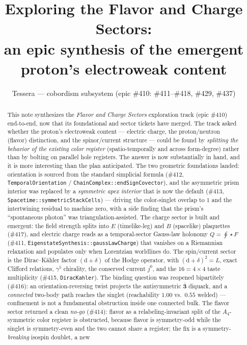\documentclass[11pt]{article}
\title{\bfseries Exploring the Flavor and Charge Sectors:\\
an epic synthesis of the emergent proton's electroweak content}
\author{Tessera --- cobordism subsystem
(epic \#410: \#411--\#418, \#429, \#437)}
\date{}
\theoremstyle{definition}
\newcommand{\rep}[1]{\mathbf{#1}}
\newcommand{\dd}{\mathrm{d}}
\newcommand{\code}[1]{\texttt{#1}}
\begin{document}
\maketitle

\begin{abstract}
This note synthesizes the \emph{Flavor and Charge Sectors} exploration track (epic
\#410) end-to-end, now that its foundational and sector tickets have merged. The track
asked whether the proton's electroweak content --- electric charge, the proton/neutron
(flavor) distinction, and the spinor/current structure --- could be found by
\emph{splitting the behavior of the existing color register} (spatio-temporally and
across form-degree) rather than by bolting on parallel hole registers. The answer is now
substantially in hand, and it is more interesting than the plan anticipated. The two
geometric foundations landed: orientation is sourced from the standard simplicial formula
(\#412, \code{TemporalOrientation} / \code{ChainComplex::endSignCovector}), and the
asymmetric prism interior was replaced by a \emph{symmetric apex interior} that is now the
default (\#413, \code{Spacetime::symmetricStackCells}) --- driving the color-singlet
overlap to $1$ and the intertwining residual to machine zero, with a side finding that the
prism's ``spontaneous photon'' was triangulation-assisted. The charge sector is built and
emergent: the field strength splits into $E$ (timelike-leg) and $B$ (spacelike)
plaquettes (\#417), and electric charge reads as a temporal-sector Gauss-law holonomy
$Q=\oint\!\star F$ (\#411, \code{EigenstateSynthesis::gaussLawCharge}) that vanishes on a
Riemannian relaxation and populates only when Lorentzian worldlines do. The spin/current
sector is the Dirac--K\"ahler factor $(\dd+\delta)$ of the Hodge operator, with
$(\dd+\delta)^2=L$, exact Clifford relations, $\gamma^5$ chirality, the conserved current
$j^0$, and the $16=4\times4$ taste multiplicity (\#415, \code{DiracKahler}). The binding
question was reopened bipartitely (\#416): an orientation-reversing twist projects the
antisymmetric $\bar{\rep3}$ diquark, and a \emph{connected} two-body path reaches the
singlet (reachability $1.00$ vs.\ $0.55$ welded) --- confinement is not a fundamental
obstruction inside one connected bulk. The flavor sector returned a clean \emph{no-go}
(\#414): flavor as a relabeling-invariant split of the $A_4$-symmetric color register is
obstructed, because flavor is symmetry-odd while the singlet is symmetry-even and the two
cannot share a register; the fix is a symmetry-\emph{breaking} isospin doublet, a new

\end{abstract}
\end{document}
